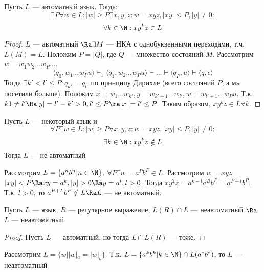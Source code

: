 
\begin{lemma}[О разрастании]
    Пусть \(L\) --- автоматный язык. Тогда:
    \[\exists P \forall w \in L: |w| \ge P \exists x, y, z: w = xyz, |xy| \le P, |y| \ne 0:\]
    \[\forall k \in \N: xy^kz \in L\]
\end{lemma}
\begin{proof}
    \(L\) --- автоматный \(\Ra \exists M\) --- НКА с однобуквенными переходами, т.ч. \(L(M) = L\). Положим \(P = |Q|\), где \(Q\) --- множество состояний \(M\). Рассмотрим \(w = w_1w_2\dots w_P\dots\).
    \[\langle q_0, w_1\dots w_Pu\rangle \vdash_1 \langle q_1, w_2\dots w_Pu\rangle \vdash \dots \vdash \langle q_P, u\rangle \vdash \langle q, \epsilon \rangle\]
    Тогда \(\exists k' < l' \le P: q_{k'} = q_{l'}\) по принципу Дирихле (всего состояний \(P\), а мы посетили больше). Положим \(x = w_1\dots w_{k'}, y = w_{k' + 1}\dots w_{l'}, w = w_{l' + 1}\dots w_P u\). Т.к. \(k1 \ne l' \Ra |y| = l' - k' > 0, l' \le P \ra |x| = l' \le P\). Таким образом, \(xy^kz \in L \forall k\).
\end{proof}

\begin{note}
    Пусть \(L\) --- некоторый язык и
    \[\forall P \exists w \in L: |w| \ge P \forall x, y, z: w = xyz, |xy| \le P, |y| \ne 0:\]
    \[\exists k \in \N: xy^kz \notin L\]
    Тогда \(L\) --- не автоматный
\end{note}
\begin{example}
    Рассмотрим \(L = \{a^nb^n | n \in \N\}\). \(\forall P \exists w = a^Pb^P \in L\). Рассмотрим \(w = xyz\). \(|xy| < P \Ra xy = a^k, |y| > 0 \Ra y = a^l, l > 0\). Тогда \(xy^2z = a^{k - l}a^{2l}b^P = a^{P + l}b^P\). Т.к. \(l > 0\), то \(a^{P + L}b^P \notin L \Ra L\) --- не автоматный.
\end{example}

\begin{proposition}
    Пусть \(L\) --- язык, \(R\) --- регулярное выражение, \(L(R) \cap L\) --- неавтоматный \(\Ra\) \(L\) --- неавтоматный
\end{proposition}
\begin{proof}
    Пусть \(L\) --- автоматный, но тогда \(L \cap L(R)\) --- тоже.
\end{proof}

\begin{example}
    Рассмотрим \(L = \{w | |w|_a = |w|_b\}\). Т.к. \(L = \{a^kb^k | k \in \N\} \cap L(a^*b^*)\), то \(L\) --- неавтоматный
\end{example}

